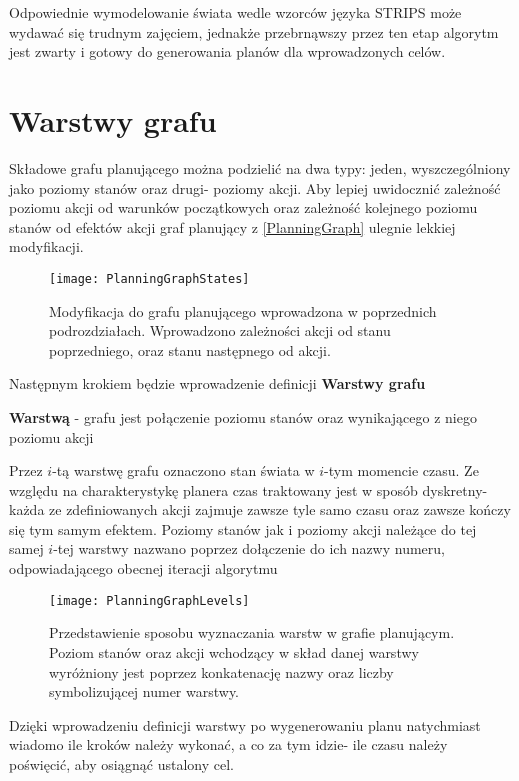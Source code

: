     
    Odpowiednie wymodelowanie świata wedle wzorców języka STRIPS może wydawać się trudnym zajęciem, jednakże przebrnąwszy 
    przez ten etap algorytm jest zwarty i gotowy do generowania planów dla wprowadzonych celów.


\section{Warstwy grafu}
    Składowe grafu planującego można podzielić na dwa typy: jeden, wyszczególniony jako poziomy stanów oraz drugi- poziomy akcji. Aby lepiej 
    uwidocznić zależność poziomu akcji od warunków początkowych oraz zależność kolejnego poziomu stanów od efektów akcji graf planujący 
    z \ref{PlanningGraph} ulegnie lekkiej modyfikacji. 
    \begin{figure}[H]
        \texttt{[image: PlanningGraphStates]}
        \centering
        \caption{Modyfikacja do grafu planującego wprowadzona w poprzednich podrozdziałach. Wprowadzono zależności akcji od stanu poprzedniego, oraz stanu 
        następnego od akcji.}
        \label{PlanningGraphStates}
    \end{figure}
    Następnym krokiem będzie wprowadzenie definicji \textbf{Warstwy grafu}
    \begin{definition}
        \label{Warstwa}
        \textbf{Warstwą} - grafu jest połączenie poziomu stanów oraz wynikającego z niego poziomu akcji
    \end{definition}
    Przez $i$-tą warstwę grafu oznaczono stan świata w $i$-tym momencie czasu. Ze względu na charakterystykę planera czas traktowany jest w sposób dyskretny-
    każda ze zdefiniowanych akcji zajmuje zawsze tyle samo czasu oraz zawsze kończy się tym samym efektem. Poziomy stanów jak i poziomy akcji 
    należące do tej samej $i$-tej warstwy nazwano poprzez dołączenie do ich nazwy numeru, odpowiadającego obecnej iteracji algorytmu
    \begin{figure}[H]
        \texttt{[image: PlanningGraphLevels]}
        \centering
        \caption{Przedstawienie sposobu wyznaczania warstw w grafie planującym. Poziom stanów oraz akcji wchodzący w skład danej warstwy 
        wyróżniony jest poprzez konkatenację nazwy oraz liczby symbolizującej numer warstwy.}
        \label{PlanningGraphLevels}
    \end{figure}
    Dzięki wprowadzeniu definicji warstwy po wygenerowaniu 
    planu natychmiast wiadomo ile kroków należy wykonać, a co za tym idzie- ile czasu należy poświęcić, aby osiągnąć ustalony cel. 

